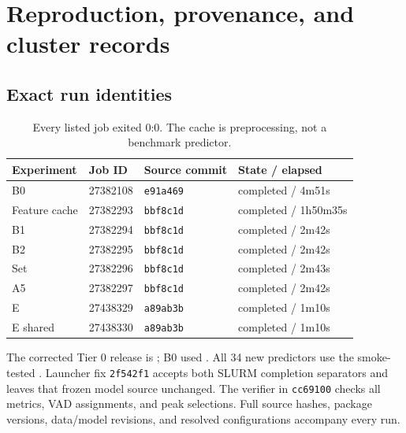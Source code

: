 \documentclass[11pt,a4paper]{article}
\newcommand{\code}[1]{\texttt{#1}}
\begin{document}


\section{Reproduction, provenance, and cluster records}
\subsection{Exact run identities}
\begin{table}[!htbp]\centering\small
\begin{tabular}{llll}\toprule
Experiment & Job ID & Source commit & State / elapsed \\\midrule
B0 & 27382108 & \code{e91a469} & completed / 4m51s \\
Feature cache & 27382293 & \code{bbf8c1d} & completed / 1h50m35s \\
B1 & 27382294 & \code{bbf8c1d} & completed / 2m42s \\
B2 & 27382295 & \code{bbf8c1d} & completed / 2m42s \\
Set & 27382296 & \code{bbf8c1d} & completed / 2m43s \\
A5 & 27382297 & \code{bbf8c1d} & completed / 2m42s \\
E & 27438329 & \code{a89ab3b} & completed / 1m10s \\
E shared & 27438330 & \code{a89ab3b} & completed / 1m10s \\\bottomrule
\end{tabular}
\caption{Every listed job exited 0:0. The cache is preprocessing, not a benchmark predictor.}\label{tab:jobs}
\end{table}\FloatBarrier
The corrected Tier 0 release is ; B0 used . All 34 new predictors use the smoke-tested . Launcher fix \code{2f542f1} accepts both SLURM completion separators and leaves that frozen model source unchanged. The verifier in \code{cc69100} checks all metrics, VAD assignments, and peak selections. Full source hashes, package versions, data/model revisions, and resolved configurations accompany every run.
\end{document}
